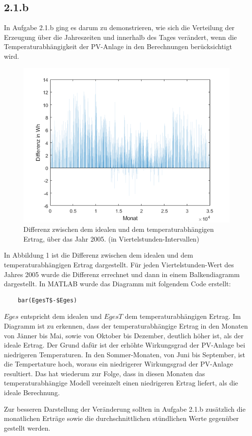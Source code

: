 \documentclass[a4paper,12pt]{article}
\begin{document}
	\subsection{2.1.b}
	In Aufgabe 2.1.b ging es darum zu demonstrieren, wie sich die Verteilung der Erzeugung über die Jahreszeiten und innerhalb des Tages verändert, wenn die Temperaturabhängigkeit der PV-Anlage in den Berechnungen berücksichtigt wird.\newline
	\begin{figure}[H]
		\centering
		\includegraphics[width=12cm]{img/results/DifferenzIdealTemp}
		\caption{Differenz zwischen dem idealen und dem temperaturabhängigen Ertrag, über das Jahr 2005. (in Viertelstunden-Intervallen)}
	\end{figure}
	In Abbildung 1 ist die Differenz zwischen dem idealen und dem temperaturabhängigen Ertrag dargestellt. Für jeden Viertelstunden-Wert des Jahres 2005 wurde die Differenz errechnet und dann in einem Balkendiagramm dargestellt.\newline
	In MATLAB wurde das Diagramm mit folgendem Code erstellt:
	\begin{lstlisting}
	bar(EgesT$-$Eges)
	\end{lstlisting}
	$Eges$ entspricht dem idealen und $EgesT$ dem temperaturabhängigen Ertrag.\newline
	Im Diagramm ist zu erkennen, dass der temperaturabhängige Ertrag in den Monaten von Jänner bis Mai, sowie von Oktober bis Dezember, deutlich höher ist, als der ideale Ertrag. Der Grund dafür ist der erhöhte Wirkungsgrad der PV-Anlage bei niedrigeren Temperaturen.\newline
	In den Sommer-Monaten, von Juni bis September, ist die Tempertature hoch, woraus ein niedrigerer Wirkungsgrad der PV-Anlage resultiert. Das hat wiederum zur Folge, dass in diesen Monaten das temperaturabhängige Modell vereinzelt einen niedrigeren Ertrag liefert, als die ideale Berechnung. \\ \par Zur besseren Darstellung der Veränderung sollten in Aufgabe 2.1.b zusätzlich die monatlichen Erträge sowie die durchschnittlichen stündlichen Werte gegenüber gestellt werden.\\ \par
\end{document}
